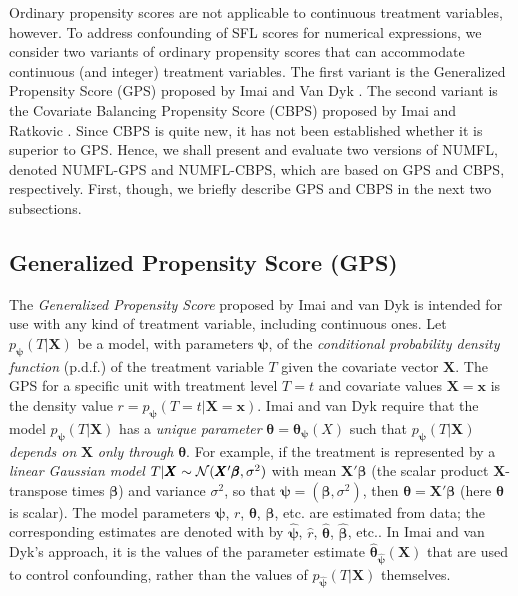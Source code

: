 Ordinary propensity scores are not applicable to continuous treatment variables, however.  To address confounding of SFL scores for numerical expressions, we consider two variants of ordinary propensity scores that can accommodate continuous (and integer) treatment variables.  The first variant is the Generalized Propensity Score (GPS) proposed by Imai and Van Dyk \cite{Imai2004}.  The second variant is the Covariate Balancing Propensity Score (CBPS) proposed by Imai and Ratkovic \cite{Imai2014}.  Since CBPS is quite new, it has not been established whether it is superior to GPS.  Hence, we shall present and evaluate two versions of NUMFL, denoted NUMFL-GPS and NUMFL-CBPS, which are based on GPS and CBPS, respectively.  First, though, we briefly describe GPS and CBPS in the next two subsections.

\subsection{Generalized Propensity Score (GPS)}\label{IIIC}
The {\it Generalized Propensity Score} proposed by Imai and van Dyk \cite{Imai2004} is intended for use with any kind of treatment variable, including continuous ones.  Let ${p_{\pmb{\psi}} }(T|\pmb{X})$  be a model, with parameters $\pmb{\psi}$, of the {\it conditional probability density function} (p.d.f.) of the treatment variable $T$ given the covariate vector $\pmb{X}$.  The GPS for a specific unit with treatment level $T=t$ and covariate values $\pmb{X=x}$ is the density value $r = {p_{\pmb\psi} }(T = t|{\pmb X} = {\pmb x})$.  Imai and van Dyk \cite{Imai2004} require that the model ${p_{\pmb{\psi}} }(T|\pmb{X})$ has a {\it unique parameter} ${\pmb\theta}  = \pmb{\theta _\psi }(X)$ such that ${p_{\pmb{\psi}} }(T|\pmb{X})$ {\it depends on} $\pmb X$ {\it only through} $\pmb \theta$.  For example, if the treatment is represented by a {\it linear Gaussian model} $T|\pmb{X} \sim {\cal N}(\pmb{X}'{\pmb \beta} ,{\sigma ^2})$ with mean $\pmb{X}'{\pmb \beta}$  (the scalar product $\pmb{X}$-transpose times $\pmb{\beta}$) and variance $\sigma ^2$, so that $\pmb{\psi}  = \left( {\pmb{\beta} ,{\sigma ^2}} \right)$, then $\pmb{\theta}  = \pmb{X}'\pmb{\beta} $ (here $\pmb{\theta} $ is scalar).  The model parameters $\pmb{\psi}$, $r$, $\pmb{\theta}$, $\pmb{\beta}$, etc. are estimated from data; the corresponding estimates are denoted with by $\hat {\pmb\psi} $, $\hat r$, $\hat{ \pmb{\theta}} $, $\hat{ \pmb{\beta}}$, etc..  In Imai and van Dyk's approach, it is the values of the parameter estimate ${{\hat{\pmb{\theta}} }_{\hat{ \pmb{\psi}} }}(\pmb{X})$ that are used to control confounding, rather than the values of ${p_{\hat{ \pmb{\psi}} }}(T|\pmb{X})$ themselves.

